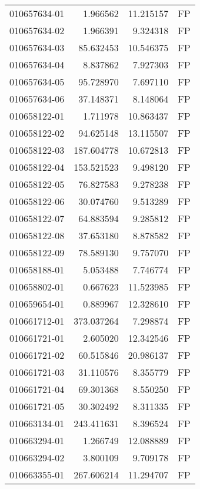 \begin{tabular}{lrrl}
010657634-01 &    1.966562 &      11.215157 &   FP \\
010657634-02 &    1.966391 &       9.324318 &   FP \\
010657634-03 &   85.632453 &      10.546375 &   FP \\
010657634-04 &    8.837862 &       7.927303 &   FP \\
010657634-05 &   95.728970 &       7.697110 &   FP \\
010657634-06 &   37.148371 &       8.148064 &   FP \\
010658122-01 &    1.711978 &      10.863437 &   FP \\
010658122-02 &   94.625148 &      13.115507 &   FP \\
010658122-03 &  187.604778 &      10.672813 &   FP \\
010658122-04 &  153.521523 &       9.498120 &   FP \\
010658122-05 &   76.827583 &       9.278238 &   FP \\
010658122-06 &   30.074760 &       9.513289 &   FP \\
010658122-07 &   64.883594 &       9.285812 &   FP \\
010658122-08 &   37.653180 &       8.878582 &   FP \\
010658122-09 &   78.589130 &       9.757070 &   FP \\
010658188-01 &    5.053488 &       7.746774 &   FP \\
010658802-01 &    0.667623 &      11.523985 &   FP \\
010659654-01 &    0.889967 &      12.328610 &   FP \\
010661712-01 &  373.037264 &       7.298874 &   FP \\
010661721-01 &    2.605020 &      12.342546 &   FP \\
010661721-02 &   60.515846 &      20.986137 &   FP \\
010661721-03 &   31.110576 &       8.355779 &   FP \\
010661721-04 &   69.301368 &       8.550250 &   FP \\
010661721-05 &   30.302492 &       8.311335 &   FP \\
010663134-01 &  243.411631 &       8.396524 &   FP \\
010663294-01 &    1.266749 &      12.088889 &   FP \\
010663294-02 &    3.800109 &       9.709178 &   FP \\
010663355-01 &  267.606214 &      11.294707 &   FP \\

\end{tabular}
